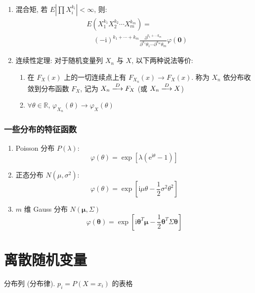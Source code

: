 \documentclass[11pt,a4paper,twocolumn]{article} %
\numberwithin{equation}{section} %
\renewcommand*{\vec}[1]{\bm{#1}} %
\newcommand\mi{\mathrm{i}}
\newcommand\e{\mathrm{e}} %
\begin{document}
\begin{enumerate}
	\item 混合矩, 若 $E|\prod X_i^{k_i}|<\infty$, 则:
	\begin{equation}
	\begin{split}
		&E\left(X_1^{k_1}X_2^{k_2}\cdots X_m^{k_m}\right) = \\
		&\quad(-\mi)^{k_1 + \cdots + k_m}
		\frac{\partial^{k_1+\cdots k_m}}{\partial^{k_1}\theta_1\cdots
		\partial^{k_m}\theta_m}\varphi(\vec 0)
	\end{split}
	\end{equation}
	\item 连续性定理: 对于随机变量列 $X_n$ 与 $X$, 以下两种说法等价: 
	\begin{enumerate}
		\item 在 $F_X(x)$ 上的一切连续点上有 $F_{X_n}(x)\to F_X(x)$. 
		称为 $X_n$ 依分布收敛到分布函数 $F_X$, 记为
		$X_n\xlongrightarrow{D} F_X$ (或 $X_n\xlongrightarrow{D} X$)
		\item $\forall \theta\in\mathbb R$, 
		$\varphi_{X_n}(\theta)\to\varphi_X(\theta)$
	\end{enumerate}
\end{enumerate}
\subsubsection{一些分布的特征函数} %
\label{ssub:chara_func_eg}
\begin{enumerate}
	\item Poisson 分布 $P(\lambda)$: 
	\begin{equation}
		\varphi (\theta) = \exp\left[\lambda(\e^{\mi\theta} - 1)\right]
	\end{equation}
	\item 正态分布 $N(\mu, \sigma^2)$: 
	\begin{equation}
		\varphi(\theta) = \exp\left[\mi\mu\theta - 
		\frac 12 \sigma^2\theta^2\right]
	\end{equation}
	\item $m$ 维 Gauss 分布 $N(\vec \mu, \Sigma)$
	\begin{equation}\label{equ:chra_func_gauss}
		\varphi(\vec\theta) = \exp\left[\mi\vec\theta^T\vec\mu
		-\frac 12\vec\theta^T\Sigma\vec\theta\right]
	\end{equation}
\end{enumerate}
\section{离散随机变量} %
\label{sec:discrete}
分布列 (分布律). $p_i = P(X = x_i)$ 的表格
\end{document}
